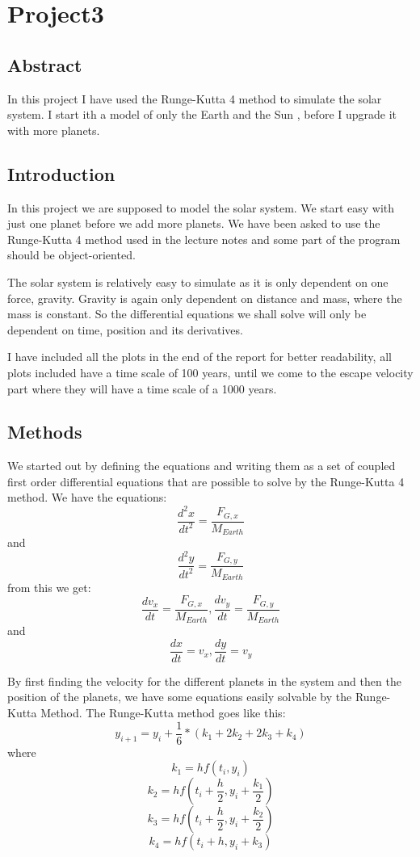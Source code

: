 \documentclass[a4wide,12pt]{article}
\begin{document}
\section*{Project3}
\subsection*{Abstract}
In this project I have used the Runge-Kutta 4 method to simulate the solar system. I start ith a model of only the Earth and the Sun , before I upgrade it with more planets.
\subsection*{Introduction}
In this project we are supposed to model the solar system. We start easy with just one planet before we add more planets. We have been asked to use the Runge-Kutta 4 method used in the lecture notes and some part of the program should be object-oriented. 

The solar system is relatively easy to simulate as it is only dependent on one force, gravity. Gravity is again only dependent on distance and mass, where the mass is constant. So the differential equations we shall solve will only be dependent on time, position and its derivatives. 

I have included all the plots in the end of the report for better readability, all plots included have a time scale of 100 years, until we come to the escape velocity part where they will have a time scale of a 1000 years.  
\subsection*{Methods}
We started out by defining the equations and writing them as a set of coupled first order differential equations that are possible to solve by the Runge-Kutta 4 method. We have the equations:
\[
\frac{d^{2}x}{dt^{2}} = \frac{F_{G,x}}{M_{Earth}}
\]
and 
\[
\frac{d^{2}y}{dt^{2}} = \frac{F_{G,y}}{M_{Earth}}
\]
from this we get:
\[ 
\frac{dv_{x}}{dt} = \frac{F_{G,x}}{M_{Earth}} , \frac{dv_{y}}{dt} = \frac{F_{G,y}}{M_{Earth}}
\]
and
\[
\frac{dx}{dt} = v_{x} , \frac{dy}{dt} = v_{y}
\]

By first finding the velocity for the different planets in the system and then the position of the planets, we have some equations easily solvable by the Runge-Kutta Method. The Runge-Kutta method goes like this:
\[
y_{i+1} = y_{i} + \frac{1}{6}*(k_{1}+2k_{2}+2k_{3}+k_{4})
\]
where
\[
k_{1} =  hf(t_{i}, y_{i})
\]
\[
k_{2} = hf(t_{i}+\frac{h}{2}, y_{i} + \frac{k_{1}}{2})
\]
\[
k_{3} = hf(t_{i}+\frac{h}{2}, y_{i} + \frac{k_{2}}{2})
\]
\[
k_{4} = hf(t_{i}+h, y_{i}+k_{3})
\]
\end{document}
